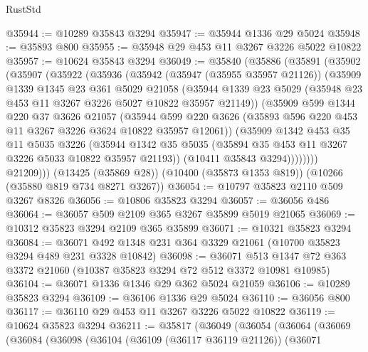 \begin{lexlean}{RustStd}
\begin{coremodule}
{\begin{coremodule}
{{{{{{{{{{{{{{{{{{{{{{{{{@35944 := @10289 @35843 @3294
@35947 := @35944 @1336 @29 @5024
@35948 := @35893 @800
@35955 := @35948 @29 @453 @11 @3267 @3226 @5022 @10822
@35957 := @10624 @35843 @3294
@36049 := @35840
    (@35886
      (@35891
        (@35902
          (@35907
            (@35922
              (@35936
                (@35942
                  (@35947 (@35955 @35957 @21126))
                  (@35909
                    @1339
                    @1345
                    @23
                    @361
                    @5029
                    @21058
                    (@35944
                      @1339
                      @23
                      @5029
                      (@35948 @23 @453 @11 @3267 @3226 @5027 @10822 @35957 @21149))
                    (@35909
                      @599
                      @1344
                      @220
                      @37
                      @3626
                      @21057
                      (@35944
                        @599
                        @220
                        @3626
                        (@35893 @596 @220 @453 @11 @3267 @3226 @3624 @10822 @35957 @12061))
                      (@35909
                        @1342
                        @453
                        @35
                        @11
                        @5035
                        @3226
                        (@35944
                          @1342
                          @35
                          @5035
                          (@35894 @35 @453 @11 @3267 @3226 @5033 @10822 @35957 @21193))
                        (@10411 @35843 @3294))))))))
          @21209)))
    (@13425 (@35869 @28))
    (@10400 (@35873 @1353 @819))
    (@10266 (@35880 @819 @734 @8271 @3267))
@36054 := @10797 @35823 @2110 @509 @3267 @8326
@36056 := @10806 @35823 @3294
@36057 := @36056 @486
@36064 := @36057 @509 @2109 @365 @3267 @35899 @5019 @21065
@36069 := @10312 @35823 @3294 @2109 @365 @35899
@36071 := @10321 @35823 @3294
@36084 := @36071 @492 @1348 @231 @364 @3329 @21061 (@10700 @35823 @3294 @489 @231 @3328 @10842)
@36098 := @36071 @513 @1347 @72 @363 @3372 @21060 (@10387 @35823 @3294 @72 @512 @3372 @10981 @10985)
@36104 := @36071 @1336 @1346 @29 @362 @5024 @21059
@36106 := @10289 @35823 @3294
@36109 := @36106 @1336 @29 @5024
@36110 := @36056 @800
@36117 := @36110 @29 @453 @11 @3267 @3226 @5022 @10822
@36119 := @10624 @35823 @3294
@36211 := @35817
    (@36049
      (@36054
        (@36064
          (@36069
            (@36084
              (@36098
                (@36104
                  (@36109 (@36117 @36119 @21126))
                  (@36071
}}}}}}}}}}}}}}}}}}}}}}}}}
\end{coremodule}}
\end{coremodule}
\end{lexlean}
